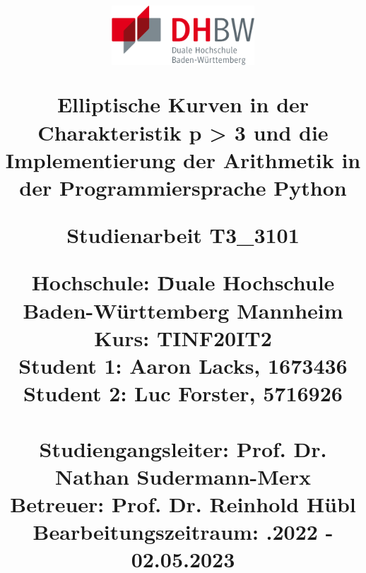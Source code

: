 \begin{titlepage}
\centering
\title{		
	\includegraphics[width=0.4\textwidth]{grafiken/dhbw.png}\\       		 
	\vspace{1.0cm}
          
    \begin{singlespacing}
    {\Large Elliptische Kurven in der Charakteristik p > 3 und die Implementierung der Arithmetik in der Programmiersprache Python}	\\
    \vspace{1.8cm}	
    \begin{normalfont}
	{\large Studienarbeit T3\_3101}
	\end{normalfont}
    \vspace{1.8cm}
    \begin{onehalfspacing}
    \begin{normalsize}
	\begin{normalfont}
	\begin{tabbing}
	Hochschule: \hspace{2.7cm} \= Duale Hochschule Baden-Württemberg Mannheim\\
	Kurs: \> TINF20IT2\\	
	Student 1: \> Aaron Lacks, 1673436\\
	Student 2: \> Luc Forster, 5716926\\		
	\vspace{1.0cm}\\
	Studiengangsleiter:  \> Prof. Dr. Nathan Sudermann-Merx\\
	Betreuer: \> Prof. Dr. Reinhold Hübl\\	
	Bearbeitungszeitraum: .2022 - 02.05.2023\\	
	\end{tabbing}
	\end{normalfont}
	\end{normalsize}
	\end{onehalfspacing}
	\end{singlespacing}	
}
\author{}
\date{} 
\maketitle		
\end{titlepage}